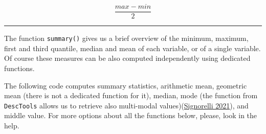 \documentclass[
]{article}
\newenvironment{Shaded}{\begin{snugshade}}{\end{snugshade}}
\newcommand{\CommentTok}[1]{\textcolor[rgb]{0.56,0.35,0.01}{\textit{#1}}}
\newcommand{\DecValTok}[1]{\textcolor[rgb]{0.00,0.00,0.81}{#1}}
\newcommand{\FunctionTok}[1]{\textcolor[rgb]{0.13,0.29,0.53}{\textbf{#1}}}
\newcommand{\NormalTok}[1]{#1}
\newcommand{\SpecialCharTok}[1]{\textcolor[rgb]{0.81,0.36,0.00}{\textbf{#1}}}
\begin{document}
\begin{equation}
\frac{max-min}{2}
\label{eq:mv}
\end{equation}

\begin{center}\rule{0.5\linewidth}{0.5pt}\end{center}

The function \texttt{summary()} gives us a brief overview of the minimum,
maximum, first and third quantile, median and mean of each variable, or
of a single variable. Of course these measures can be also computed
independently using dedicated functions.

The following code computes summary statistics, arithmetic mean,
geometric mean (there is not a dedicated function for it), median, mode
(the function from \texttt{DescTools} allows us to retrieve also multi-modal
values)(\protect\hyperlink{ref-signorelli2021}{Signorelli 2021}), and middle value. For more options about all
the functions below, please, look in the help.

\begin{Shaded}
\end{Shaded}

~

~

~
\end{document}
